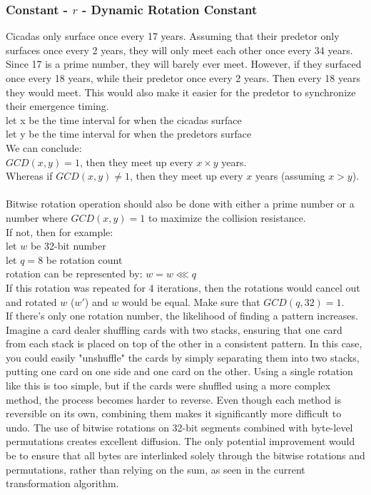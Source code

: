 \documentclass[fleqn, a4paper,12pt]{article}
\begin{document}
\subsubsection{Constant - $r$ - Dynamic Rotation Constant} \label{rotation_constant}

Cicadas only surface once every 17 years. Assuming that their predetor only surfaces once every 2 years, they will only meet each other once every 34 years. Since 17 is a prime number, they will barely ever meet. However, if they surfaced once every 18 years, while their predetor once every 2 years. Then every 18 years they would meet. This would also make it easier for the predetor to synchronize their emergence timing.\\
let x be the time interval for when the cicadas surface \\
let y be the time interval for when the predetors surface \\
We can conclude:\\
$GCD(x,y) = 1$, then they meet up every $x \times y$ years. \\
Whereas if $GCD(x,y) \neq 1$, then they meet up every $x$ years (assuming $x > y$). \\
\\
Bitwise rotation operation should also be done with either a prime number or a number where $GCD(x,y) = 1$ to maximize the collision resistance.\\

If not, then for example: \\
let $w$ be 32-bit number\\
let $q = 8$ be rotation count\\
rotation can be represented by: $w = w \lll q$\\
If this rotation was repeated for 4 iterations, then the rotations would cancel out and rotated $w$ ($w'$) and $w$ would be equal. Make sure that $GCD(q, 32) = 1$. \\

If there's only one rotation number, the likelihood of finding a pattern increases. Imagine a card dealer shuffling cards with two stacks, ensuring that one card from each stack is placed on top of the other in a consistent pattern. In this case, you could easily "unshuffle" the cards by simply separating them into two stacks, putting one card on one side and one card on the other. Using a single rotation like this is too simple, but if the cards were shuffled using a more complex method, the process becomes harder to reverse. Even though each method is reversible on its own, combining them makes it significantly more difficult to undo. The use of bitwise rotations on 32-bit segments combined with byte-level permutations creates excellent diffusion. The only potential improvement would be to ensure that all bytes are interlinked solely through the bitwise rotations and permutations, rather than relying on the sum, as seen in the current transformation algorithm.
\end{document}
